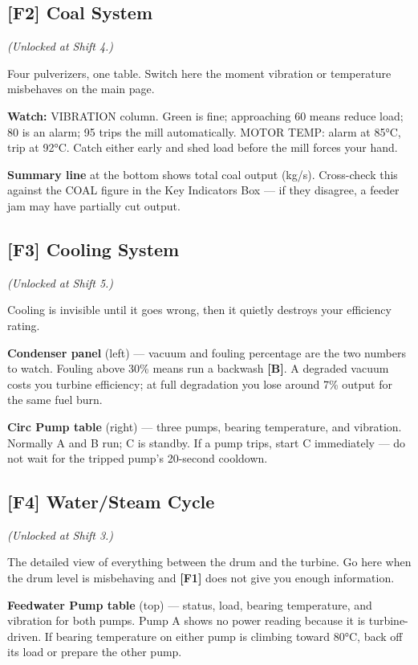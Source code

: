 \documentclass[10pt,a5paper]{article}
\newcommand{\key}[1]{\textbf{[#1]}}
\begin{document}
\subsection{\key{F2} Coal System} \textit{(Unlocked at Shift 4.)}

Four pulverizers, one table. Switch here the moment vibration or temperature
misbehaves on the main page.

\textbf{Watch:} VIBRATION column. Green is fine; approaching 60 means reduce
load; 80 is an alarm; 95 trips the mill automatically. MOTOR TEMP: alarm at
85°C, trip at 92°C. Catch either early and shed load before the mill forces
your hand.

\textbf{Summary line} at the bottom shows total coal output (kg/s). Cross-check
this against the COAL figure in the Key Indicators Box --- if they disagree, a
feeder jam may have partially cut output.

\subsection{\key{F3} Cooling System} \textit{(Unlocked at Shift 5.)}

Cooling is invisible until it goes wrong, then it quietly destroys your
efficiency rating.

\textbf{Condenser panel} (left) --- vacuum and fouling percentage are the two
numbers to watch. Fouling above 30\% means run a backwash \key{B}. A degraded
vacuum costs you turbine efficiency; at full degradation you lose around 7\%
output for the same fuel burn.

\textbf{Circ Pump table} (right) --- three pumps, bearing temperature, and
vibration. Normally A and B run; C is standby. If a pump trips, start C
immediately --- do not wait for the tripped pump's 20-second cooldown.

\subsection{\key{F4} Water/Steam Cycle} \textit{(Unlocked at Shift 3.)}

The detailed view of everything between the drum and the turbine. Go here when
the drum level is misbehaving and \key{F1} does not give you enough information.

\textbf{Feedwater Pump table} (top) --- status, load, bearing temperature,
and vibration for both pumps. Pump A shows no power reading because it is
turbine-driven. If bearing temperature on either pump is climbing toward 80°C,
back off its load or prepare the other pump.
\end{document}
